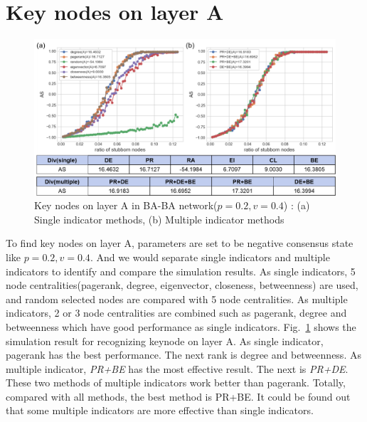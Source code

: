 \section{Key nodes on layer A}
\begin{figure}[!htb]
	\centering
	\includegraphics[width=\hsize]{figure/chap5_keynode_A.png}
	\caption{Key nodes on layer A in BA-BA network($p=0.2, v=0.4$) : (a) Single indicator methods, (b) Multiple indicator methods}
	\label{chap5_keynode_A}
\end{figure}
To find key nodes on layer A, parameters are set to be negative consensus state like $p=0.2, v=0.4$. And we would separate single indicators and multiple indicators to identify and compare the simulation results. As single indicators, 5 node centralities(pagerank, degree, eigenvector, closeness, betweenness) are used, and random selected nodes are compared with 5 node centralities. As multiple indicators, 2 or 3 node centralities are combined such as pagerank, degree and betweenness which have good performance as single indicators.  
Fig.~\ref{chap5_keynode_A} shows the simulation result for recognizing keynode on layer A. As single indicator, pagerank has the best performance. The next rank is degree and betweenness. As multiple indicator, \textit{PR+BE} has the most effective result. The next is \textit{PR+DE}. These two methods of multiple indicators work better than pagerank. Totally, compared with all methods, the best method is PR+BE. It could be found out that some multiple indicators are more effective than single indicators. 

